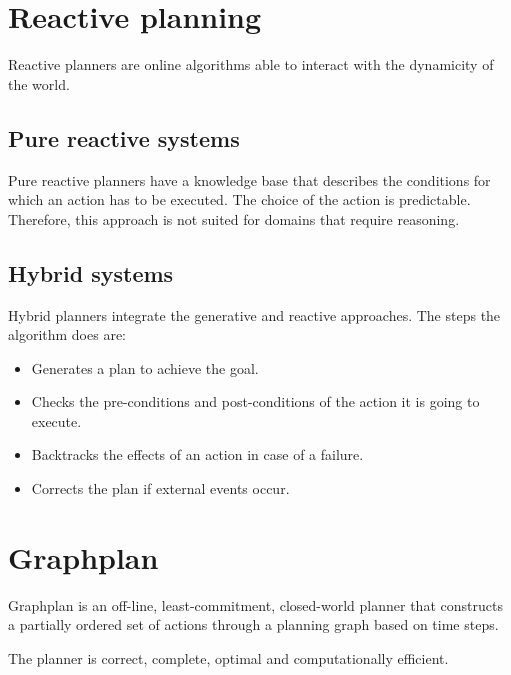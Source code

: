 \section{Reactive planning}
Reactive planners are online algorithms able to interact with the dynamicity of the world.

\subsection{Pure reactive systems}
Pure reactive planners have a knowledge base that describes the conditions for which an action has to be executed.
The choice of the action is predictable. Therefore, this approach is not suited for domains that require reasoning.

\subsection{Hybrid systems}
Hybrid planners integrate the generative and reactive approaches.
The steps the algorithm does are:
\begin{itemize}
    \item Generates a plan to achieve the goal.
    \item Checks the pre-conditions and post-conditions of the action it is going to execute.
    \item Backtracks the effects of an action in case of a failure.
    \item Corrects the plan if external events occur.
\end{itemize}



\section{Graphplan}
Graphplan is an off-line, least-commitment, closed-world planner that
constructs a partially ordered set of actions through a planning graph based on time steps.

The planner is correct, complete, optimal and computationally efficient.



